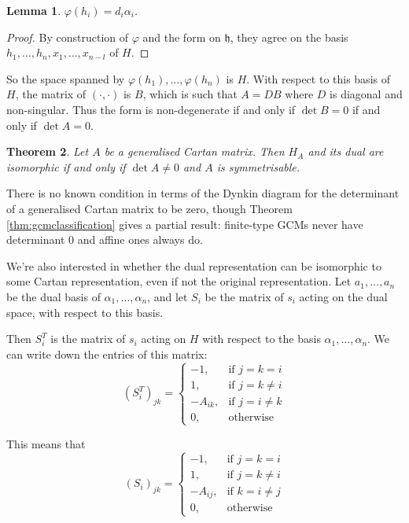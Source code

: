 \documentclass[11pt,a4paper]{report}
\newtheorem{theorem}{Theorem}[chapter]
\newtheorem{lemma}[theorem]{Lemma}
\theoremstyle{definition}
\begin{document}
\begin{lemma} $\varphi(h_i) = d_i \alpha_i$. \end{lemma}

\begin{proof}By construction of $\varphi$ and the form on $\mathfrak{h}$, they agree on the basis $h_1, \ldots, h_n, x_1, \ldots, x_{n-l}$ of $H$.\end{proof}

So the space spanned by $\varphi(h_1), \ldots, \varphi(h_n)$ is $H$. With respect to this basis of $H$, the matrix of $(\cdot, \cdot)$ is $B$, which is such that $A = DB$ where $D$ is diagonal and non-singular. Thus the form is non-degenerate if and only if $\det B = 0$ if and only if $\det A = 0$.

\begin{theorem} \label{thm:dualisomorphcond} Let $A$ be a generalised Cartan matrix. Then $H_A$ and its dual are isomorphic if and only if $\det A \neq 0$ and $A$ is symmetrisable.\end{theorem}

There is no known condition in terms of the Dynkin diagram for the determinant of a generalised Cartan matrix to be zero, though Theorem \ref{thm:gcmclassification} gives a partial result: finite-type GCMs never have determinant $0$ and affine ones always do. 

We're also interested in whether the dual representation can be isomorphic to some Cartan representation, even if not the original representation. Let $a_1, \ldots, a_n$ be the dual basis of $\alpha_1, \ldots, \alpha_n$, and let $S_i$ be the matrix of $s_i$ acting on the dual space, with respect to this basis. 

Then $S_i^T$ is the matrix of $s_i$ acting on $H$ with respect to the basis $\alpha_1, \ldots, \alpha_n$. We can write down the entries of this matrix: \begin{equation*}(S_i^T)_{jk} = \begin{cases}
    -1, & \text{if }  j = k = i\\
    1, & \text{if }j = k \neq i\\
    -A_{ik}, & \text{if } j = i \neq k\\
    0, & \text{otherwise}
\end{cases}\end{equation*}

This means that \begin{equation*}(S_i)_{jk} = \begin{cases}
    -1, & \text{if } j = k = i\\
    1, & \text{if } j = k \neq i\\
    -A_{ij}, & \text{if }k = i \neq j\\
    0, & \text{otherwise}
\end{cases}\end{equation*}
\end{document}
